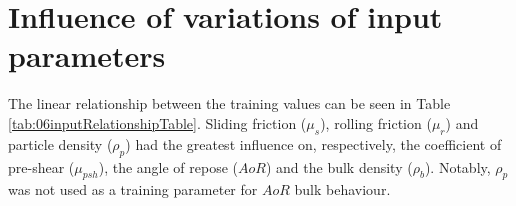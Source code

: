 
\chapter{Influence of variations of input parameters}
\label{cap:influence}




The linear relationship between the
training values can be seen in Table \ref{tab:06inputRelationshipTable}.
Sliding friction ($\mu_s$), rolling friction ($\mu_r$) and particle density ($\rho_p$)
had the greatest influence on, respectively, the coefficient of pre-shear
($\mu_{psh}$), the angle of repose  ($AoR$) and the bulk density ($\rho_b$). Notably, $\rho_p$
was not used as a training parameter for $AoR$ bulk behaviour. 

